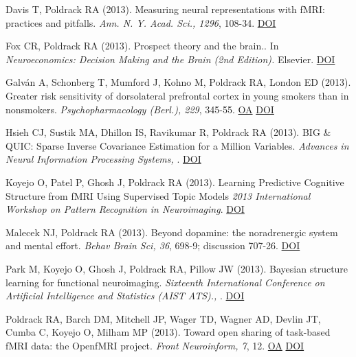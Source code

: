 Davis T, Poldrack RA (2013). Measuring neural representations with fMRI: practices and pitfalls. \textit{Ann. N. Y. Acad. Sci., 1296}, 108-34. \href{http://dx.doi.org/10.1111/nyas.12156}{DOI} \vspace{2mm}

Fox CR, Poldrack RA (2013). Prospect theory and the brain.. In \textit{Neuroeconomics: Decision Making and the Brain (2nd Edition).} Elsevier. \href{http://dx.doi.org/9780124160088}{DOI} \vspace{2mm}

Galván A, Schonberg T, Mumford J, Kohno M, Poldrack RA, London ED (2013). Greater risk sensitivity of dorsolateral prefrontal cortex in young smokers than in nonsmokers. \textit{Psychopharmacology (Berl.), 229}, 345-55. \href{https://www.ncbi.nlm.nih.gov/pmc/articles/PMC3758460}{OA} \href{http://dx.doi.org/10.1007/s00213-013-3113-x}{DOI} \vspace{2mm}

Hsieh CJ, Sustik MA, Dhillon IS, Ravikumar R,  Poldrack RA (2013). BIG \& QUIC: Sparse Inverse Covariance Estimation for a Million Variables. \textit{Advances in Neural Information Processing Systems, }. \href{http://dx.doi.org/cxuijsrb}{DOI} \vspace{2mm}

Koyejo O, Patel P, Ghosh J, Poldrack RA (2013). Learning Predictive Cognitive Structure from fMRI Using Supervised Topic Models \textit{2013 International Workshop on Pattern Recognition in Neuroimaging}. \href{http://dx.doi.org/10.1109/prni.2013.12}{DOI} \vspace{2mm}

Malecek NJ, Poldrack RA (2013). Beyond dopamine: the noradrenergic system and mental effort. \textit{Behav Brain Sci, 36}, 698-9; discussion 707-26. \href{http://dx.doi.org/10.1017/s0140525x13001106}{DOI} \vspace{2mm}

Park M, Koyejo O, Ghosh J, Poldrack RA, Pillow JW (2013). Bayesian structure learning for functional neuroimaging. \textit{Sixteenth International Conference on Artificial Intelligence and Statistics (AIST ATS)., }. \href{http://dx.doi.org/htypsryf}{DOI} \vspace{2mm}

Poldrack RA, Barch DM, Mitchell JP, Wager TD, Wagner AD, Devlin JT, Cumba C, Koyejo O, Milham MP (2013). Toward open sharing of task-based fMRI data: the OpenfMRI project. \textit{Front Neuroinform, 7}, 12. \href{https://www.ncbi.nlm.nih.gov/pmc/articles/PMC3703526}{OA} \href{http://dx.doi.org/10.3389/fninf.2013.00012}{DOI} \vspace{2mm}

